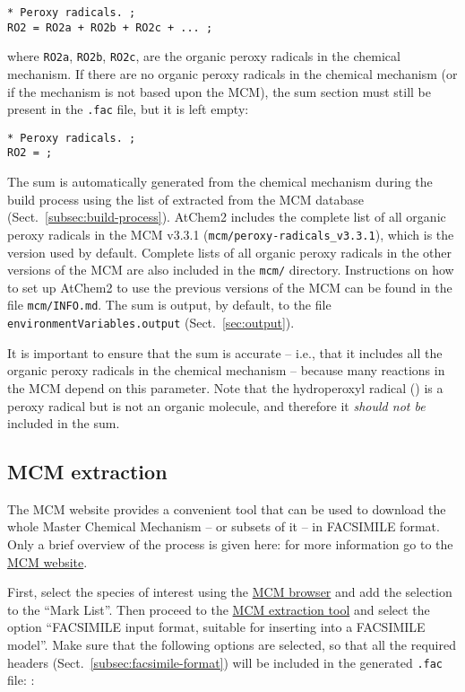 \begin{verbatim}
* Peroxy radicals. ;
RO2 = RO2a + RO2b + RO2c + ... ;
\end{verbatim}

where \texttt{RO2a}, \texttt{RO2b}, \texttt{RO2c}, are the organic
peroxy radicals in the chemical mechanism. If there are no organic
peroxy radicals in the chemical mechanism (or if the mechanism is not
based upon the MCM), the  sum section must still be present in
the \texttt{.fac} file, but it is left empty:

\begin{verbatim}
* Peroxy radicals. ;
RO2 = ;
\end{verbatim}

The  sum is automatically generated from the chemical
mechanism during the build process using the list of 
extracted from the MCM database (Sect.~\ref{subsec:build-process}).
AtChem2 includes the complete list of all organic peroxy radicals in
the MCM v3.3.1 (\texttt{mcm/peroxy-radicals\_v3.3.1}), which is the
version used by default. Complete lists of all organic peroxy radicals
in the other versions of the MCM are also included in the
\texttt{mcm/} directory. Instructions on how to set up AtChem2 to use
the previous versions of the MCM can be found in the file
\texttt{mcm/INFO.md}. The  sum is output, by default, to the
file \texttt{environmentVariables.output} (Sect.~\ref{sec:output}).

It is important to ensure that the  sum is accurate -- i.e.,
that it includes all the organic peroxy radicals in the chemical
mechanism -- because many reactions in the MCM depend on this
parameter. Note that the hydroperoxyl radical () is a peroxy
radical but is not an organic molecule, and therefore it
\emph{should not be} included in the  sum.

\subsection{MCM extraction} \label{subsec:mcm-extraction}

The MCM website provides a convenient tool that can be used to
download the whole Master Chemical Mechanism -- or subsets of it -- in
FACSIMILE format. Only a brief overview of the process is given here:
for more information go to the \href{http://mcm.leeds.ac.uk/}{MCM website}.

First, select the species of interest using the
\href{http://mcm.leeds.ac.uk/MCM/roots.htt}{MCM browser} and add the
selection to the ``Mark List''. Then proceed to the
\href{http://mcm.leeds.ac.uk/MCM/extract.htt}{MCM extraction tool} and
select the option ``FACSIMILE input format, suitable for inserting
into a FACSIMILE model''. Make sure that the following options are
selected, so that all the required headers
(Sect.~\ref{subsec:facsimile-format}) will be included in the
generated \texttt{.fac} file: :


